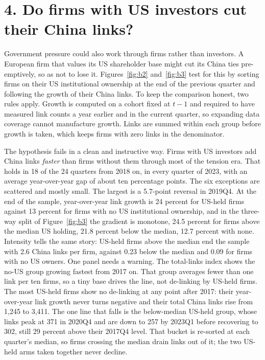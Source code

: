 \documentclass[11pt]{article}
\begin{document}
\section*{4. Do firms with US investors cut their China links?}

Government pressure could also work through firms rather than investors. A
European firm that values its US shareholder base might cut its China ties
pre-emptively, so as not to lose it. Figures~\ref{fig:b2} and~\ref{fig:b3}
test for this by sorting firms on their US institutional ownership at the end
of the previous quarter and following the growth of their China links. To
keep the comparison honest, two rules apply. Growth is computed on a cohort fixed
at $t-1$ and required to have measured link counts a year earlier and in the
current quarter, so expanding data coverage cannot manufacture growth. Links are
summed within each group before growth is taken, which keeps firms with zero links
in the denominator.

The hypothesis fails in a clean and instructive way. Firms with US investors add China links
\emph{faster} than firms without them through most of the tension era. That holds
in 18 of the 24 quarters from 2018 on, in every quarter of 2023, with an average
year-over-year gap of about ten percentage points. The six exceptions are scattered
and mostly small. The largest is a 5.7-point reversal in 2019Q4. At the end of the sample, year-over-year link
growth is 24
percent for US-held firms against 13 percent for firms with no US
institutional ownership, and in the three-way split of Figure~\ref{fig:b3}
the gradient is monotone, 24.5 percent for firms above the median US
holding, 21.8 percent below the median, 12.7 percent with none. Intensity
tells the same story: US-held firms above the median end the sample with 2.6
China links per firm, against 0.23 below the median and 0.09 for firms with
no US owners. One panel needs a warning. The total-links index shows the no-US group growing
fastest from 2017 on. That group averages fewer than one link per ten firms, so a
tiny base drives the line, not de-linking by US-held firms.
The most US-held firms show no de-linking at any point after 2017: their
year-over-year link growth never turns negative and their total China links
rise from 1,245 to 3,411. The one line that falls is the below-median US-held
group, whose links peak at 371 in 2020Q4 and are down to 257 by 2023Q1 before
recovering to 302, still 29 percent above their 2017Q4 level. That bucket is
re-sorted at each quarter's median, so firms crossing the median drain links
out of it; the two US-held arms taken together never decline.
\end{document}
